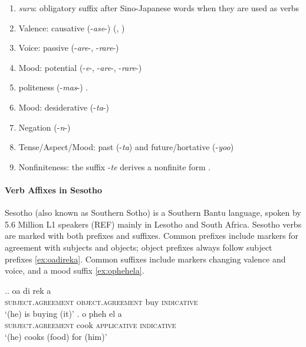 \begin{enumerate}
\item \textit{suru}: obligatory suffix after Sino-Japanese words when they are used as verbs
\item Valence: causative (-\textit{ase}-) (\citet[142]{hasegawa2014japanese}, \citet[Chapter 13]{kaiser2013japanese})
\item Voice: passive (-\textit{are}-, -\textit{rare}-) \cite[152]{hasegawa2014japanese} \cite[Chapter 12]{kaiser2013japanese}
\item Mood: potential (-\textit{e}-, -\textit{are}-, -\textit{rare}-) \cite[398]{kaiser2013japanese}  
\item politeness (-\textit{mas}-) \cite[190]{kaiser2013japanese}.
\item Mood: desiderative (-\textit{ta}-) \cite[238]{kaiser2013japanese}
\item Negation (-\textit{n}-)
\item Tense/Aspect/Mood: past (-\textit{ta}) and future/hortative (-\textit{yoo}) \cite[229]{kaiser2013japanese}
\item Nonfiniteness: the suffix -\textit{te} derives a nonfinite form \cite[186]{kaiser2013japanese}.
\end{enumerate}







\paragraph{Verb Affixes in Sesotho}
Sesotho (also known as Southern Sotho) is a Southern Bantu language, spoken by 5.6 Million L1 speakers (REF) mainly in Lesotho and South Africa.
Sesotho verbs are marked with both prefixes and suffixes.
Common prefixes include markers for agreement with subjects and objects; object prefixes always follow subject prefixes \ref{ex:oadireka}.
Common suffixes include markers changing valence and voice, and a mood suffix \ref{ex:ophehela}.

\ex.\ag. oa di rek a \\
\textsc{subject.agreement} \textsc{object.agreement} buy \textsc{indicative} \\
`(he) is buying (it)'  \cite[ex (41)]{demuth1992acquisition} \label{ex:oadireka}
\bg. o pheh el a \\
\textsc{subject.agreement} cook \textsc{applicative} \textsc{indicative} \\
`(he) cooks (food) for (him)'  \cite[ex (41)]{demuth1992acquisition}
\label{ex:ophehela}

